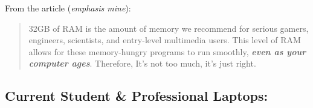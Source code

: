 \documentclass[14pt, letterpaper,twoside]{extreport}
\begin{document}
From the article (\emph{emphasis mine}):
\begin{quote}
	32GB of RAM is the amount of memory we recommend for serious gamers, engineers, scientists, and entry-level multimedia users. This level of RAM allows for these memory-hungry programs to run smoothly, \textbf{\emph{even as your computer ages}}. Therefore, It's not too much, it's just right.
\end{quote}

\pagebreak \hypertarget{current-student-professional-laptops}{%
	\subsection*{Current Student \& Professional
		Laptops:}\label{current-student-professional-laptops}}
\end{document}
